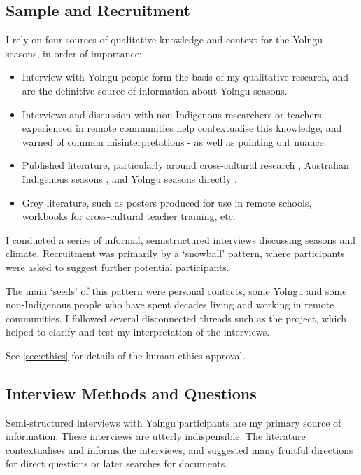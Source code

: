 \subsection{Sample and Recruitment}


I rely on four sources of qualitative knowledge and context for the Yolngu
seasons, in order of importance:

\begin{itemize}
\item Interview with Yolngu people form the basis of my qualitative research, and
        are the definitive source of information about Yolngu seasons.
\item Interviews and discussion with non-Indigenous researchers or teachers experienced
        in remote communities help contextualise this knowledge, and warned of
        common misinterpretations - as well as pointing out nuance.
\item Published literature, particularly around cross-cultural research \citep[eg.][]{smith1999},
        Australian Indigenous seasons \citep[eg.][]{prober2011,oconnor2010}, and Yolngu
        seasons directly \citep{davis1989}.
\item Grey literature, such as posters produced for use in remote schools, workbooks
        for cross-cultural teacher training, etc.
\end{itemize}


I conducted a series of informal, semistructured interviews discussing
seasons and climate. Recruitment was primarily by a `snowball' pattern,
where participants were asked to suggest further potential participants.

The main `seeds' of this pattern were personal contacts, some Yolngu and some
non-Indigenous people who have spent decades living and working in remote
communities. I followed several disconnected threads such as the
\citet{CSIROcals} project, which helped to clarify and test my interpretation
of the interviews.

See \cref{sec:ethics} for details of the human ethics approval.


\subsection{Interview Methods and Questions}
Semi-structured interviews with Yolngu participants are my primary source
of information.  These interviews are utterly indispensible.
The literature contextualises and informs the interviews, and suggested many fruitful
directions for direct questions or later searches for documents.

